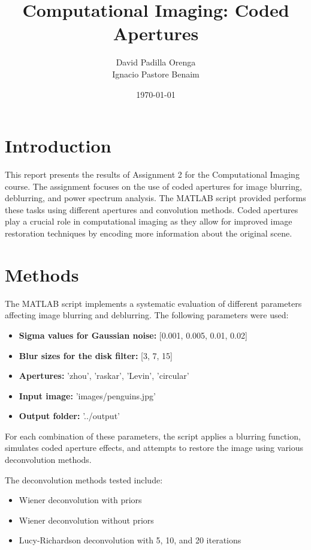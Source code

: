 \documentclass[a4paper,10pt]{article}
\title{Computational Imaging: Coded Apertures}
\author{David Padilla Orenga \\ Ignacio Pastore Benaim}
\date{\today}
\begin{document}
\maketitle
\thispagestyle{empty}
\newpage
\setcounter{page}{1}

\section{Introduction}
This report presents the results of Assignment 2 for the Computational Imaging course. The assignment focuses on the use of coded apertures for image blurring, deblurring, and power spectrum analysis. The MATLAB script provided performs these tasks using different apertures and convolution methods. Coded apertures play a crucial role in computational imaging as they allow for improved image restoration techniques by encoding more information about the original scene.

\section{Methods}
The MATLAB script implements a systematic evaluation of different parameters affecting image blurring and deblurring. The following parameters were used:
\begin{itemize}
    \item \textbf{Sigma values for Gaussian noise:} [0.001, 0.005, 0.01, 0.02]
    \item \textbf{Blur sizes for the disk filter:} [3, 7, 15]
    \item \textbf{Apertures:} {'zhou', 'raskar', 'Levin', 'circular'}
    \item \textbf{Input image:} 'images/penguins.jpg'
    \item \textbf{Output folder:} '../output'
\end{itemize}

For each combination of these parameters, the script applies a blurring function, simulates coded aperture effects, and attempts to restore the image using various deconvolution methods. 

The deconvolution methods tested include:
\begin{itemize}
    \item Wiener deconvolution with priors
    \item Wiener deconvolution without priors
    \item Lucy-Richardson deconvolution with 5, 10, and 20 iterations
\end{itemize}
\end{document}
